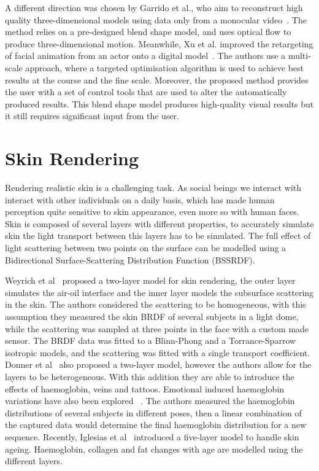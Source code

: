 \documentclass[11pt]{report}
\begin{document}
A different direction was chosen by Garrido et al., who aim to reconstruct high quality three-dimensional models using data only from a monocular video~\cite{Garrido:2013}. The method relies on a pre-designed blend shape model, and uses optical flow to produce three-dimensional motion. Meanwhile, Xu et al. improved the retargeting of facial animation from an actor onto a digital model~\cite{Xu:2014}. The authors use a multi-scale approach, where a targeted optimisation algorithm is used to achieve best results at the course and the fine scale. Moreover, the proposed method provides the user with a set of control tools that are used to alter the automatically produced results. This blend shape model produces high-quality visual results but it still requires significant input from the user.


\section{Skin Rendering}

Rendering realistic skin is a challenging task.
As social beings we interact with interact with other individuals on a daily basis, which has made human perception quite sensitive to skin appearance, even more so with human faces.
Skin is composed of several layers with different properties, to accurately simulate skin the light transport between this layers has to be simulated.
The full effect of light scattering between two points on the surface can be modelled using a Bidirectional Surface-Scattering Distribution Function (BSSRDF).

Weyrich et al~\cite{Weyrich2006} proposed a two-layer model for skin rendering, the outer layer simulates the air-oil interface and the inner layer models the subsurface scattering in the skin.
The authors considered the scattering to be homogeneous, with this assumption they measured the skin BRDF of several subjects in a light dome, while the scattering was sampled at three points in the face with a custom made sensor.
The BRDF data was fitted to a Blinn-Phong and a Torrance-Sparrow isotropic models, and the scattering was fitted with a single transport coefficient.
Donner et al~\cite{Donner2008} also proposed a two-layer model, however the authors allow for the layers to be heterogeneous.
With this addition they are able to introduce the effects of haemoglobin, veins and tattoos.
Emotional induced haemoglobin variations have also been explored ~\cite{Jimenez2010}.
The authors measured the haemoglobin distributions of several subjects in different poses, then a linear combination of the captured data would determine the final haemoglobin distribution for a new sequence.
Recently, Iglesias et al~\cite{Iglesias2015} introduced a five-layer model to handle skin ageing.
Haemoglobin, collagen and fat changes with age are modelled using the different layers.
\end{document}
